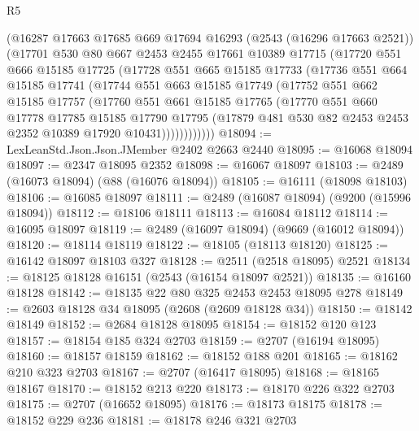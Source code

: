 \begin{lexlean}{R5}
\begin{coremodule}
        (@16287
          @17663
          @17685
          @669
          @17694
          @16293
          (@2543 (@16296 @17663 @2521))
          (@17701
            @530
            @80
            @667
            @2453
            @2455
            @17661
            @10389
            @17715
            (@17720
              @551
              @666
              @15185
              @17725
              (@17728
                @551
                @665
                @15185
                @17733
                (@17736
                  @551
                  @664
                  @15185
                  @17741
                  (@17744
                    @551
                    @663
                    @15185
                    @17749
                    (@17752
                      @551
                      @662
                      @15185
                      @17757
                      (@17760
                        @551
                        @661
                        @15185
                        @17765
                        (@17770
                          @551
                          @660
                          @17778
                          @17785
                          @15185
                          @17790
                          @17795
                          (@17879 @481 @530 @82 @2453 @2453 @2352 @10389 @17920 @10431))))))))))))
@18094 := LexLeanStd.Json.Json.JMember @2402 @2663 @2440
@18095 := @16068 @18094
@18097 := @2347 @18095 @2352
@18098 := @16067 @18097
@18103 := @2489 (@16073 @18094) (@88 (@16076 @18094))
@18105 := @16111 (@18098 @18103)
@18106 := @16085 @18097
@18111 := @2489 (@16087 @18094) (@9200 (@15996 @18094))
@18112 := @18106 @18111
@18113 := @16084 @18112
@18114 := @16095 @18097
@18119 := @2489 (@16097 @18094) (@9669 (@16012 @18094))
@18120 := @18114 @18119
@18122 := @18105 (@18113 @18120)
@18125 := @16142 @18097 @18103 @327
@18128 := @2511 (@2518 @18095) @2521
@18134 := @18125 @18128 @16151 (@2543 (@16154 @18097 @2521))
@18135 := @16160 @18128
@18142 := @18135 @22 @80 @325 @2453 @2453 @18095 @278
@18149 := @2603 @18128 @34 @18095 (@2608 (@2609 @18128 @34))
@18150 := @18142 @18149
@18152 := @2684 @18128 @18095
@18154 := @18152 @120 @123
@18157 := @18154 @185 @324 @2703
@18159 := @2707 (@16194 @18095)
@18160 := @18157 @18159
@18162 := @18152 @188 @201
@18165 := @18162 @210 @323 @2703
@18167 := @2707 (@16417 @18095)
@18168 := @18165 @18167
@18170 := @18152 @213 @220
@18173 := @18170 @226 @322 @2703
@18175 := @2707 (@16652 @18095)
@18176 := @18173 @18175
@18178 := @18152 @229 @236
@18181 := @18178 @246 @321 @2703

\end{coremodule}
\end{lexlean}
